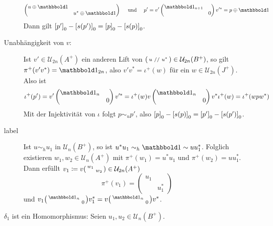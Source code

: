 \begin{beweis}[Idee]
\begin{description}
\[\begin{pmatrix}
				u \oplus \ind & \\
				& u^* \oplus \ind
			\end{pmatrix} \quad \text{ und } \quad 
			p' = v' \begin{pmatrix}
				\ind_{n+1} & \\ & 0
			\end{pmatrix} v'^* = p \oplus \ind
		\]
		Dann gilt $\benbrace*{p'}_0 - \benbrace*{s(p')}_0 = \benbrace*{p}_0 - \benbrace*{s(p)}_0$.
		\item[Unabhängigkeit von $v$:] Ist $v' \in \mathcal{U}_{2n}(A^+)$ ein anderen Lift von $\begin{psmallmatrix} u & // & u^* \end{psmallmatrix} \in \mathcal{U}_{2n}(B^+)$, so gilt $\pi^+(v'v^*) = \ind_{2n}$, also $v'v^* = \iota^+(w)$ für ein $w \in \mathcal{U}_{2n}(J^+)$.
		Also ist
		\[
			\iota^+(p') = v' \begin{pmatrix}
				\ind_n & \\ & 0
			\end{pmatrix} v'^* = \iota^+(w) v \begin{pmatrix}
				\ind_n & \\ & 0
			\end{pmatrix} v^* \iota^+(w) = \iota^+(w p w^*)
		\]
		Mit der Injektivität von $\iota$ folgt $p \sim_u p'$, also $\benbrace*{p}_0 - \benbrace*{s(p)}_0 = \benbrace*{p'}_0 - \benbrace*{s(p')}_0$.
		\item[label] Ist $u \sim_h u_1$ in $\mathcal{U}_n(B^+)$, so ist $u^* u_1 \sim_h \ind \sim u u_1^*$.
		Folglich existieren $w_1, w_2 \in \mathcal{U}_n(A^+)$ mit $\pi^+(w_1) = u^* u_1$ und $\pi^+(w_2)= uu_1^*$.
		Dann erfüllt $v_1 \coloneqq v \begin{psmallmatrix} w_1 & \\ & w_2 \end{psmallmatrix} \in \mathcal{U}_{2n}(A^+)$ 
		\[
			\pi^+(v_1) = \begin{pmatrix}
				u_1 & \\ & u_1^*
			\end{pmatrix}
		\]
		und $v_1 \begin{psmallmatrix}
			\ind_n & \\ & 0
		\end{psmallmatrix} v_1^* = v \begin{psmallmatrix}
			\ind_n & \\ & 0
		\end{psmallmatrix} v^*$.
	\end{description}
	$\delta_1$ ist ein Homomorphismus: Seien $u_1,u_2 \in \mathcal{U}_n(B^+)$.

\end{beweis}

